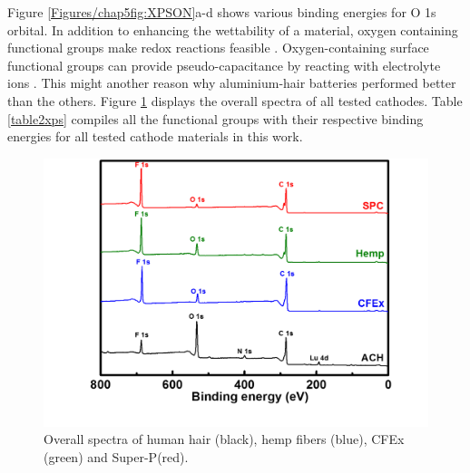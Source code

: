 Figure \ref{Figures/chap5fig:XPSON}a-d shows various binding energies for O 1s orbital. In addition to enhancing the wettability of a material, oxygen containing functional groups make redox reactions feasible \cite{li_effect_2011, oh_oxygen_2014}. Oxygen-containing surface functional groups can provide pseudo-capacitance by reacting with electrolyte ions \cite{bleda-martinez_role_2005}. This might another reason why aluminium-hair batteries performed better than the others. Figure \ref{Figures/chap5fig:XPSoverall} displays the overall spectra of all tested cathodes. Table \ref{table2xps} compiles all the functional groups with their respective binding energies for all tested cathode materials in this work. 

\begin{figure}[th!]
\centering
\includegraphics[width=\textwidth]{Figures/chap5fig/XPSoverall}
\caption{Overall spectra of human hair (black), hemp fibers (blue), CFEx (green) and Super-P(red).}
\label{Figures/chap5fig:XPSoverall}
\end{figure}

